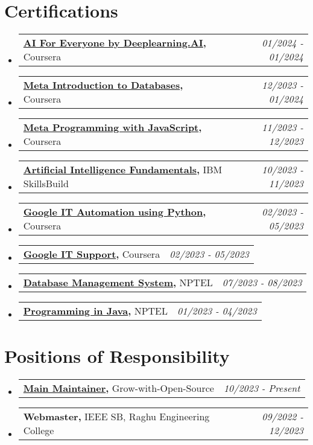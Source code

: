 \documentclass[a4paper,11pt]{article}
\makeatletter
\newcommand{\resumePOR}[3]{
\vspace{0.5mm}\item
    \begin{tabular*}{0.97\textwidth}[t]{l@{\extracolsep{\fill}}r}
        \textbf{#1}\hspace{0.3mm}#2 & \textit{\small{#3}} 
    \end{tabular*}
    \vspace{-2mm}
}
\newcommand{\resumeSubHeadingListStart}{\begin{itemize}[leftmargin=*,labelsep=0mm]}
\newcommand{\resumeSubHeadingListEnd}{\end{itemize}\vspace{2mm}}
\makeatother
\begin{document}
\section{\textbf{Certifications}}
\vspace{-0.4mm}
\resumeSubHeadingListStart
\resumePOR{\href{https://coursera.org/share/7bf632122e34fa1c4c3cfdb07d92235c}{AI For Everyone by Deeplearning.AI}, } %
    {Coursera} %
    {01/2024 - 01/2024} %
\resumePOR{\href{https://coursera.org/share/d88cc47604c586b5b32ce0d9257a7cf5}{Meta Introduction to Databases}, } %
    {Coursera} %
    {12/2023 - 01/2024} %
\resumePOR{\href{https://coursera.org/share/a1101c8906b8976f622d7c0165f1d938}{Meta Programming with JavaScript}, } %
    {Coursera} %
    {11/2023 - 12/2023} %
\resumePOR{\href{https://www.credly.com/badges/a67695f0-ca8c-43f5-bb81-98285ad9b380/public_url}{Artificial Intelligence Fundamentals}, } %
    {IBM SkillsBuild} %
    {10/2023 - 11/2023} %
\resumePOR{\href{https://www.coursera.org/account/accomplishments/professional-cert/CFAEHJKFYC7G}{Google IT Automation using Python}, } %
    {Coursera} %
    {02/2023 - 05/2023} %
\resumePOR{\href{https://www.coursera.org/account/accomplishments/professional-cert/667VZ25JENRC}{Google IT Support}, } %
    {Coursera} %
    {02/2023 - 05/2023} %
\resumePOR{\href{https://archive.nptel.ac.in/noc/Ecertificate/?q=NPTEL23CS41S1589011303003835}{Database Management System}, } %
    {NPTEL} %
    {07/2023 - 08/2023} %
\resumePOR{\href{https://archive.nptel.ac.in/noc/Ecertificate/?q=NPTEL22CS102S6417063410015197N}{Programming in Java}, } %
    {NPTEL} %
    {01/2023 - 04/2023} %
\resumeSubHeadingListEnd
\vspace{-5mm}



\section{\textbf{Positions of Responsibility}}
\vspace{-0.4mm}
\resumeSubHeadingListStart
\resumePOR{\href{https://github.com/Grow-with-Open-Source}{Main Maintainer}, } %
    {Grow-with-Open-Source} %
    {10/2023 - Present} %
\resumePOR{Webmaster, } %
    {IEEE SB, Raghu Engineering College} %
    {09/2022 - 12/2023} %
\resumeSubHeadingListEnd
\vspace{-5mm}
\end{document}
